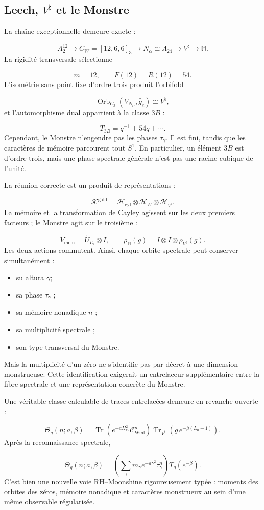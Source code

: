 \subsection{Leech, \(V^\natural\) et le Monstre}
La chaîne exceptionnelle demeure exacte :\par
\[
A_2^{12}
\longrightarrow
C_W=[12,6,6]_3
\longrightarrow
N_\alpha\cong\Lambda_{24}
\longrightarrow
V^\natural
\longrightarrow
\mathbb M.
\]
La rigidité transversale sélectionne\par
\[
m=12,
\qquad
F(12)=R(12)=54.
\]
L'isométrie sans point fixe d'ordre trois produit l'orbifold\par
\[
\operatorname{Orb}_{C_3}
(V_{N_\alpha},\widehat g_c)
\cong V^\natural,
\]
et l'automorphisme dual appartient à la classe \(3B\) :\par
\[
T_{3B}
=
q^{-1}+54q+\cdots.
\]
Cependant, le Monstre n'engendre pas les phases \(\tau_\gamma\). Il est fini, tandis que les caractères de mémoire parcourent tout \(S^1\). En particulier, un élément \(3B\) est d'ordre trois, mais une phase spectrale générale n'est pas une racine cubique de l'unité.\par
La réunion correcte est un produit de représentations :\par
\[
\mathscr K^{\mathrm{gold}}
=
\mathscr H_{\mathrm{cyl}}
\otimes
\mathcal H_W
\otimes
\mathcal H_{V^\natural}.
\]
La mémoire et la transformation de Cayley agissent sur les deux premiers facteurs ; le Monstre agit sur le troisième :\par
\[
V_{\mathrm{mem}}
=
\widetilde U_{\Gamma_9}\otimes I,
\qquad
\rho_{\mathbb M}(g)
=
I\otimes I\otimes\rho_{V^\natural}(g).
\]
Les deux actions commutent. Ainsi, chaque orbite spectrale peut conserver simultanément :\par
\begin{itemize}
\item su altura \(\gamma\);
\item sa phase \(\tau_\gamma\) ;
\item sa mémoire nonadique \(n\) ;
\item sa multiplicité spectrale ;
\item son type transversal du Monstre.
\end{itemize}
Mais la multiplicité d'un zéro ne s'identifie pas par décret à une dimension monstrueuse. Cette identification exigerait un entrelaceur supplémentaire entre la fibre spectrale et une représentation concrète du Monstre.\par
Une véritable classe calculable de traces entrelacées demeure en revanche ouverte :\par
\[
\Theta_g(n;a,\beta)
=
\operatorname{Tr}
\left(
e^{-aH_W^2}\mathcal C_{\mathrm{Weil}}^n
\right)
\operatorname{Tr}_{V^\natural}
\left(
g\,e^{-\beta(L_0-1)}
\right).
\]
Après la reconnaissance spectrale,\par
\[
\Theta_g(n;a,\beta)
=
\left(
\sum_\gamma
m_\gamma e^{-a\gamma^2}\tau_\gamma^n
\right)
T_g(e^{-\beta}).
\]
C'est bien une nouvelle voie RH–Moonshine rigoureusement typée : moments des orbites des zéros, mémoire nonadique et caractères monstrueux au sein d'une même observable régularisée.\par
{}
